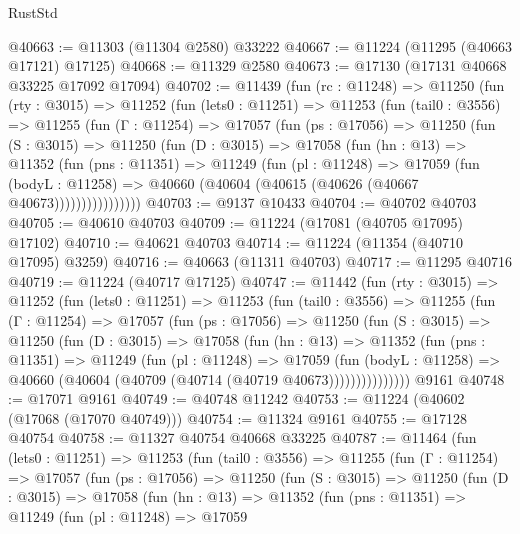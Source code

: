 \begin{lexlean}{RustStd}
\begin{coremodule}
@40663 := @11303 (@11304 @2580) @33222
@40667 := @11224 (@11295 (@40663 @17121) @17125)
@40668 := @11329 @2580
@40673 := @17130 (@17131 @40668 @33225 @17092 @17094)
@40702 := @11439
    (fun (rc : @11248) =>
    @11250
      (fun (rty : @3015) =>
      @11252
        (fun (lets0 : @11251) =>
        @11253
          (fun (tail0 : @3556) =>
          @11255
            (fun (Γ : @11254) =>
            @17057
              (fun (ps : @17056) =>
              @11250
                (fun (S : @3015) =>
                @11250
                  (fun (D : @3015) =>
                  @17058
                    (fun (hn : @13) =>
                    @11352
                      (fun (pns : @11351) =>
                      @11249
                        (fun (pl : @11248) =>
                        @17059
                          (fun (bodyL : @11258) =>
                          @40660 (@40604 (@40615 (@40626 (@40667 @40673))))))))))))))))
@40703 := @9137 @10433
@40704 := @40702 @40703
@40705 := @40610 @40703
@40709 := @11224 (@17081 (@40705 @17095) @17102)
@40710 := @40621 @40703
@40714 := @11224 (@11354 (@40710 @17095) @3259)
@40716 := @40663 (@11311 @40703)
@40717 := @11295 @40716
@40719 := @11224 (@40717 @17125)
@40747 := @11442
    (fun (rty : @3015) =>
    @11252
      (fun (lets0 : @11251) =>
      @11253
        (fun (tail0 : @3556) =>
        @11255
          (fun (Γ : @11254) =>
          @17057
            (fun (ps : @17056) =>
            @11250
              (fun (S : @3015) =>
              @11250
                (fun (D : @3015) =>
                @17058
                  (fun (hn : @13) =>
                  @11352
                    (fun (pns : @11351) =>
                    @11249
                      (fun (pl : @11248) =>
                      @17059
                        (fun (bodyL : @11258) =>
                        @40660 (@40604 (@40709 (@40714 (@40719 @40673)))))))))))))))
    @9161
@40748 := @17071 @9161
@40749 := @40748 @11242
@40753 := @11224 (@40602 (@17068 (@17070 @40749)))
@40754 := @11324 @9161
@40755 := @17128 @40754
@40758 := @11327 @40754 @40668 @33225
@40787 := @11464
    (fun (lets0 : @11251) =>
    @11253
      (fun (tail0 : @3556) =>
      @11255
        (fun (Γ : @11254) =>
        @17057
          (fun (ps : @17056) =>
          @11250
            (fun (S : @3015) =>
            @11250
              (fun (D : @3015) =>
              @17058
                (fun (hn : @13) =>
                @11352
                  (fun (pns : @11351) =>
                  @11249
                    (fun (pl : @11248) =>
                    @17059

\end{coremodule}
\end{lexlean}
